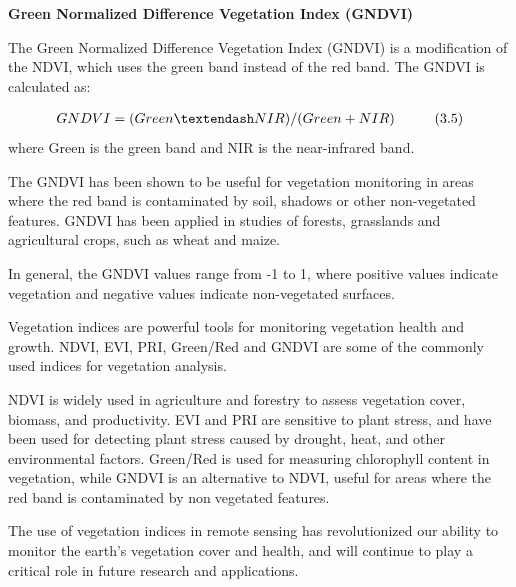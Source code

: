 \documentclass{article}
\begin{document}
{                \textbf{Green Normalized Difference Vegetation Index (GNDVI)}
                \vspace*{1\baselineskip}  
                
                \hspace{0.5cm}The Green Normalized Difference Vegetation Index (GNDVI) is a modification of the NDVI, which uses the green band instead of the red band. The GNDVI is calculated as:\par
                \begin{align*}
                    GNDVI = (Green – NIR) / (Green + NIR) \text{\hspace{1cm}(3.5)} 
                \end{align*}
                \vspace*{1\baselineskip}
                \vspace*{1\baselineskip}
                where Green is the green band and NIR is the near-infrared band.\par
                The GNDVI has been shown to be useful for vegetation monitoring in areas where the red band is contaminated by soil, shadows or other non-vegetated features. GNDVI has been applied in studies of forests, grasslands and agricultural crops, such as wheat and maize.\par
                In general, the GNDVI values range from -1 to 1, where positive values indicate vegetation and negative values indicate non-vegetated surfaces.\par
            \vspace*{1\baselineskip}
            Vegetation indices are powerful tools for monitoring vegetation health and growth. NDVI, EVI, PRI, Green/Red and GNDVI are some of the commonly used indices for vegetation analysis.\par
            NDVI is widely used in agriculture and forestry to assess vegetation cover, biomass, and productivity. EVI and PRI are sensitive to plant stress, and have been used for detecting plant stress caused by drought, heat, and other environmental factors. Green/Red is used for measuring chlorophyll content in vegetation, while GNDVI is an alternative to NDVI, useful for areas where the red band is contaminated by nonvegetated features.\par
            The use of vegetation indices in remote sensing has revolutionized our ability to monitor the earth’s vegetation cover and health, and will continue to play a critical role in future research and applications.\par
}
\end{document}
